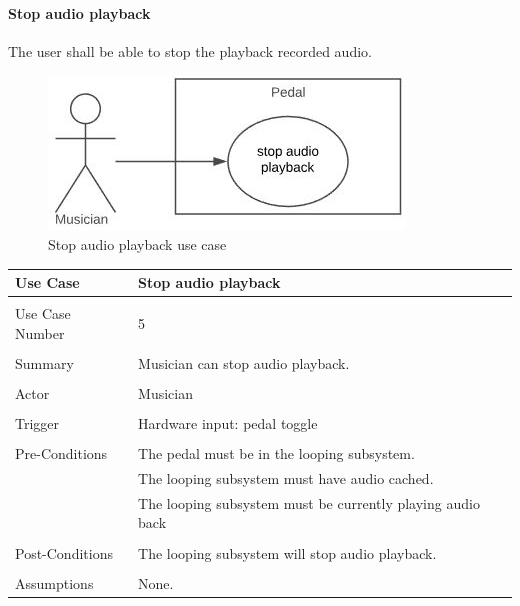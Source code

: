            \clearpage
            \paragraph{Stop audio playback} 
            The user shall be able to stop the playback recorded audio.
            \begin{figure}[!ht]
                \centering
                \includegraphics[width=.5\textwidth]{diagrams/use_cases/uc-play-stop.JPG}
                \caption{Stop audio playback use case}
                \label{fig:uc-play-stop}
            \end{figure}
            \begin{table}[!ht]
                \centering
                \begin{tabular}{l l}
                    Use Case & Stop audio playback \\ 
                    \hline \\ 
                    Use Case Number & 5 \\ \\
                    Summary & Musician can stop audio playback. \\ \\
                    Actor & Musician \\ \\
                    Trigger & Hardware input: pedal toggle \\ \\
                    Pre-Conditions & The pedal must be in the looping subsystem. \\
                    & The looping subsystem must have audio cached. \\
                    & The looping subsystem must be currently playing audio back \\ \\
                    Post-Conditions & The looping subsystem will stop audio playback. \\ \\
                    Assumptions & None.\\
                \end{tabular}
            \end{table}
            
